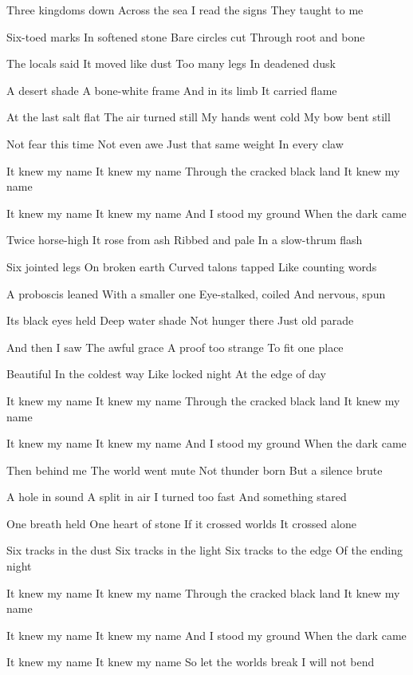 \begin{lyrics}
Three kingdoms down
Across the sea
I read the signs
They taught to me

Six-toed marks
In softened stone
Bare circles cut
Through root and bone

The locals said
It moved like dust
Too many legs
In deadened dusk

A desert shade
A bone-white frame
And in its limb
It carried flame

At the last salt flat
The air turned still
My hands went cold
My bow bent still

Not fear this time
Not even awe
Just that same weight
In every claw

It knew my name
It knew my name
Through the cracked black land
It knew my name

It knew my name
It knew my name
And I stood my ground
When the dark came

Twice horse-high
It rose from ash
Ribbed and pale
In a slow-thrum flash

Six jointed legs
On broken earth
Curved talons tapped
Like counting words

A proboscis leaned
With a smaller one
Eye-stalked, coiled
And nervous, spun

Its black eyes held
Deep water shade
Not hunger there
Just old parade

And then I saw
The awful grace
A proof too strange
To fit one place

Beautiful
In the coldest way
Like locked night
At the edge of day

It knew my name
It knew my name
Through the cracked black land
It knew my name

It knew my name
It knew my name
And I stood my ground
When the dark came

Then behind me
The world went mute
Not thunder born
But a silence brute

A hole in sound
A split in air
I turned too fast
And something stared

One breath held
One heart of stone
If it crossed worlds
It crossed alone

Six tracks in the dust
Six tracks in the light
Six tracks to the edge
Of the ending night

It knew my name
It knew my name
Through the cracked black land
It knew my name

It knew my name
It knew my name
And I stood my ground
When the dark came

It knew my name
It knew my name
So let the worlds break
I will not bend
\end{lyrics}

